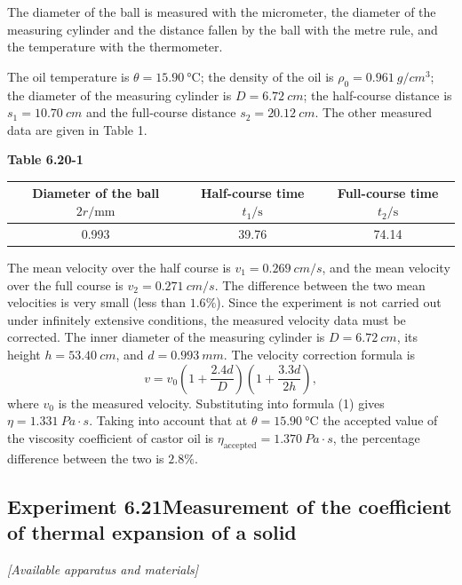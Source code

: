 The diameter of the ball is measured with the micrometer, the diameter of the measuring cylinder and the distance fallen by the ball with the metre rule, and the temperature with the thermometer.

The oil temperature is $\theta=\SI{15.90}{\celsius}$; the density of the oil is $\rho_0=\SI{0.961}{g/cm^3}$; the diameter of the measuring cylinder is $D=\SI{6.72}{cm}$; the half-course distance is $s_1=\SI{10.70}{cm}$ and the full-course distance $s_2=\SI{20.12}{cm}$. The other measured data are given in Table 1.

\begin{center}
\textbf{Table 6.20-1}\\[3pt]
\begin{tabular}{ccc}
\toprule
Diameter of the ball $2r/\mathrm{mm}$ & Half-course time $t_1/\mathrm{s}$ & Full-course time $t_2/\mathrm{s}$\\
\midrule
0.993 & 39.76 & 74.14\\
\bottomrule
\end{tabular}
\end{center}

\noindent The mean velocity over the half course is $v_1=\SI{0.269}{cm/s}$, and the mean velocity over the full course is $v_2=\SI{0.271}{cm/s}$. The difference between the two mean velocities is very small (less than $1.6\%$).
Since the experiment is not carried out under infinitely extensive conditions, the measured velocity data must be corrected. The inner diameter of the measuring cylinder is $D=\SI{6.72}{cm}$, its height $h=\SI{53.40}{cm}$, and $d=\SI{0.993}{mm}$. The velocity correction formula is
\begin{equation*}
v=v_0\left(1+\frac{2.4d}{D}\right)\left(1+\frac{3.3d}{2h}\right),
\end{equation*}
where $v_0$ is the measured velocity. Substituting into formula (1) gives $\eta=\SI{1.331}{Pa\cdot s}$. Taking into account that at $\theta=\SI{15.90}{\celsius}$ the accepted value of the viscosity coefficient of castor oil is $\eta_{\text{accepted}}=\SI{1.370}{Pa\cdot s}$, the percentage difference between the two is $2.8\%$.

\subsection*{Experiment 6.21\quad Measurement of the coefficient of thermal expansion of a solid}

\noindent\textit{[Available apparatus and materials]}

